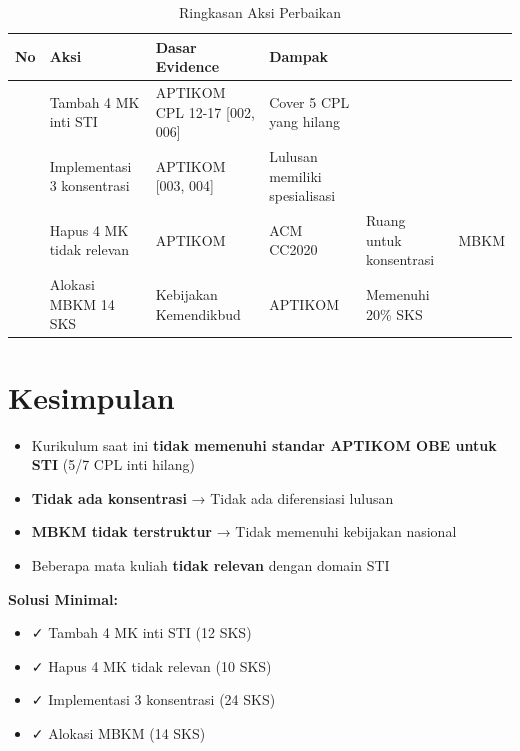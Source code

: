 \documentclass[12pt,a4paper]{report}
\newcommand{\sectioncolor}[1]{\colorbox{secondary}{\parbox{\dimexpr\linewidth-2\fboxsep}{\strut #1}}}
\begin{document}
\begin{table}[h!]
\centering
\renewcommand{\arraystretch}{1.3}
\begin{tabular}{>{\centering\arraybackslash}p{0.8cm} >{\raggedright\arraybackslash}p{5cm} >{\raggedright\arraybackslash}p{3.5cm} >{\raggedright\arraybackslash}p{3cm}}
\toprule
{}\textbf{No} & \textbf{Aksi} & \textbf{Dasar Evidence} & \textbf{Dampak} \\  & Tambah 4 MK inti STI & APTIKOM CPL 12-17 [002, 006] & Cover 5 CPL yang hilang \\  & Implementasi 3 konsentrasi & APTIKOM [003, 004] & Lulusan memiliki spesialisasi \\  & Hapus 4 MK tidak relevan & APTIKOM & ACM CC2020 & Ruang untuk konsentrasi & MBKM \\  & Alokasi MBKM 14 SKS & Kebijakan Kemendikbud & APTIKOM & Memenuhi 20\% SKS \\ \bottomrule
\end{tabular}
\caption{Ringkasan Aksi Perbaikan}
\label{tab:summary}
\end{table}

\newpage

\chapter{Kesimpulan}

\begin{itemize}
\item Kurikulum saat ini \textbf{tidak memenuhi standar APTIKOM OBE untuk STI} (5/7 CPL inti hilang)
\item \textbf{Tidak ada konsentrasi} → Tidak ada diferensiasi lulusan
\item \textbf{MBKM tidak terstruktur} → Tidak memenuhi kebijakan nasional
\item Beberapa mata kuliah \textbf{tidak relevan} dengan domain STI
\end{itemize}

\bigskip
\sectioncolor{\Large\bfseries Solusi Minimal:}

\begin{itemize}
\item \color{green}\textsf{✓} Tambah 4 MK inti STI (12 SKS)
\item \color{green}\textsf{✓} Hapus 4 MK tidak relevan (10 SKS)
\item \color{green}\textsf{✓} Implementasi 3 konsentrasi (24 SKS)
\item \color{green}\textsf{✓} Alokasi MBKM (14 SKS)
\end{itemize}
\end{document}
